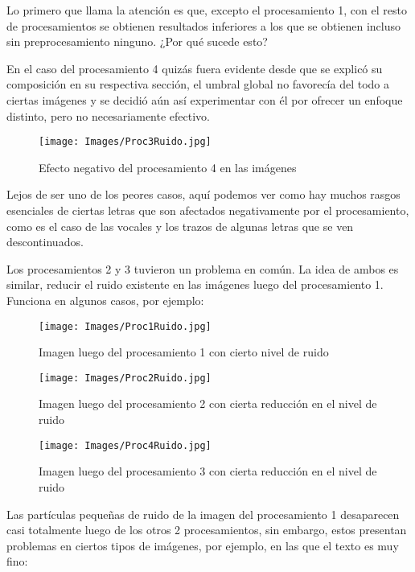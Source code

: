 \documentclass{article}
\begin{document}
Lo primero que llama la atención es que, excepto el procesamiento 1, con el resto de procesamientos se obtienen resultados inferiores a los que se obtienen incluso sin preprocesamiento ninguno. ¿Por qué sucede esto?

En el caso del procesamiento 4 quizás fuera evidente desde que se explicó su composición en su respectiva sección, el umbral global no favorecía del todo a ciertas imágenes y se decidió aún así experimentar con él por ofrecer un enfoque distinto, pero no necesariamente efectivo.

\begin{figure}[!h]
    \centering
    \texttt{[image: Images/Proc3Ruido.jpg]}
    \caption{Efecto negativo del procesamiento 4 en las imágenes}
    \label{fig:enter-label}
\end{figure}

Lejos de ser uno de los peores casos, aquí podemos ver como hay muchos rasgos esenciales de ciertas letras que son afectados negativamente por el procesamiento, como es el caso de las vocales y los trazos de algunas letras que se ven descontinuados.

Los procesamientos 2 y 3 tuvieron un problema en común. La idea de ambos es similar, reducir el ruido existente en las imágenes luego del procesamiento 1. Funciona en algunos casos, por ejemplo:

\newpage

\begin{figure}[!h]
    \centering
    \texttt{[image: Images/Proc1Ruido.jpg]}
    \caption{Imagen luego del procesamiento 1 con cierto nivel de ruido}
    \label{fig:enter-label}
\end{figure}

\begin{figure}[!h]
    \centering
    \texttt{[image: Images/Proc2Ruido.jpg]}
    \caption{Imagen luego del procesamiento 2 con cierta reducción en el nivel de ruido}
    \label{fig:enter-label}
\end{figure}

\begin{figure}[!h]
    \centering
    \texttt{[image: Images/Proc4Ruido.jpg]}
    \caption{Imagen luego del procesamiento 3 con cierta reducción en el nivel de ruido}
    \label{fig:enter-label}
\end{figure}

Las partículas pequeñas de ruido de la imagen del procesamiento 1 desaparecen casi totalmente luego de los otros 2 procesamientos, sin embargo, estos presentan problemas en ciertos tipos de imágenes, por ejemplo, en las que el texto es muy fino:
\end{document}
